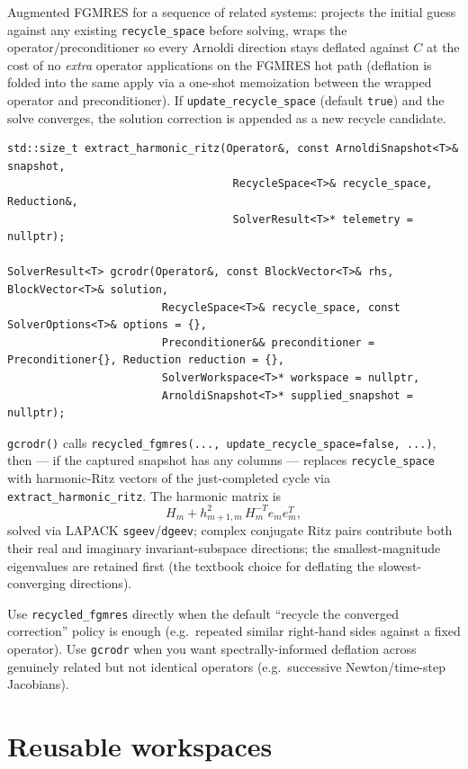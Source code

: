 \documentclass[11pt,a4paper]{report}
\begin{document}
Augmented FGMRES for a sequence of related systems: projects the
initial guess against any existing \lstinline!recycle_space! before solving,
wraps the operator/preconditioner so every Arnoldi direction stays
deflated against $C$ at the cost of no \emph{extra} operator
applications on the FGMRES hot path (deflation is folded into the same
apply via a one-shot memoization between the wrapped operator and
preconditioner). If \lstinline!update_recycle_space! (default \lstinline!true!) and the
solve converges, the solution correction is appended as a new recycle
candidate.

\begin{lstlisting}
std::size_t extract_harmonic_ritz(Operator&, const ArnoldiSnapshot<T>& snapshot,
                                   RecycleSpace<T>& recycle_space, Reduction&,
                                   SolverResult<T>* telemetry = nullptr);

SolverResult<T> gcrodr(Operator&, const BlockVector<T>& rhs, BlockVector<T>& solution,
                        RecycleSpace<T>& recycle_space, const SolverOptions<T>& options = {},
                        Preconditioner&& preconditioner = Preconditioner{}, Reduction reduction = {},
                        SolverWorkspace<T>* workspace = nullptr,
                        ArnoldiSnapshot<T>* supplied_snapshot = nullptr);
\end{lstlisting}

\lstinline!gcrodr()! calls
\lstinline!recycled_fgmres(..., update_recycle_space=false, ...)!, then --- if
the captured snapshot has any columns --- replaces \lstinline!recycle_space!
with harmonic-Ritz vectors of the just-completed cycle via
\lstinline!extract_harmonic_ritz!. The harmonic matrix is
\[
H_m + h_{m+1,m}^2\, H_m^{-T} e_m e_m^T,
\]
solved via LAPACK \lstinline!sgeev!/\lstinline!dgeev!; complex conjugate Ritz pairs
contribute both their real and imaginary invariant-subspace directions;
the smallest-magnitude eigenvalues are retained first (the textbook
choice for deflating the slowest-converging directions).

Use \lstinline!recycled_fgmres! directly when the default ``recycle the
converged correction'' policy is enough (e.g.\ repeated similar
right-hand sides against a fixed operator). Use \lstinline!gcrodr! when you
want spectrally-informed deflation across genuinely related but not
identical operators (e.g.\ successive Newton/time-step Jacobians).

\section{Reusable workspaces}
\label{sec:5.8}
\end{document}
